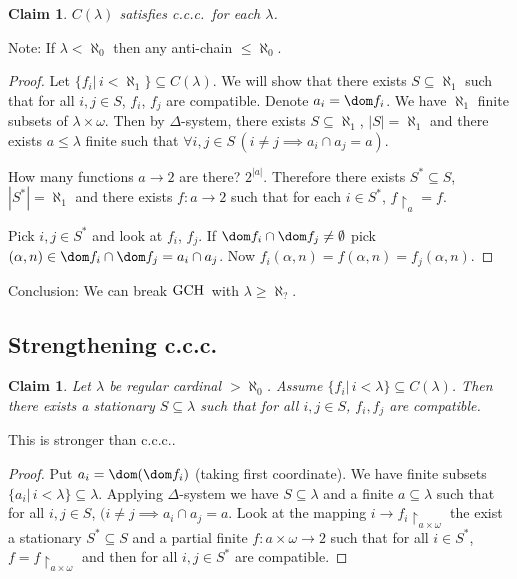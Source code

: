 \documentclass[11pt,pdftex,twoside,a4paper]{article}
\newcommand{\ccc}{c.c.c.}
\newcommand{\GCH}{\ensuremath{\mathop{\rm GCH}\nolimits}}
\newtheorem{claim}[thm]{Claim}
\theoremstyle{definition}
\begin{document}
\begin{claim}
\(C(\lambda)\) satisfies \ccc\ for each \(\lambda\).
\end{claim}
Note: If \(\lambda<\aleph_0\) then any anti-chain \(\leq\aleph_0\).
\begin{proof}
Let \(\{f_i|\, i <\aleph_1\} \subseteq C(\lambda)\).
We will show that there exists \(S\subseteq \aleph_1\) such that
for all \(i,j\in S\), \(f_i\), \(f_j\) are compatible.
Denote \(a_i = \dom f_i\). We have \(\aleph_1\) finite subsets of
\(\lambda\times\omega\).
Then by \(\Delta\)-system,
there exists \(S\subseteq \aleph_1\),
\(|S|=\aleph_1\) and there exists \(a\leq\lambda\) finite
such that \(\forall i,j\in S\, (i\neq j\implies a_i\cap a_j=a)\).

How many functions \(a\to 2\) are there? \(2^{|a|}\).
Therefore there exists \(S^*\subseteq S\), \(|S^*|=\aleph_1\)
and there exists \(f:a\to 2\) such that for each \(i\in S^*\),
\(f{\restriction}_a = f\).

Pick \(i,j\in S^*\) and look at \(f_i\), \(f_j\).
If \(\dom f_i \cap \dom f_j \neq\emptyset\)
 pick \((\alpha,n)\in \dom f_i \cap \dom f_j = a_i\cap a_j\).
Now \(f_i(\alpha,n) = f(\alpha,n) = f_j(\alpha,n)\).
\end{proof}
Conclusion: We can break \GCH\ with \(\lambda\geq\aleph_?\).

\subsection{Strengthening \ccc}

\begin{claim}
Let \(\lambda\) be regular cardinal \(>\aleph_0\).
Assume \(\{f_i|\, i < \lambda\} \subseteq C(\lambda)\).
Then there exists a stationary \(S\subseteq \lambda\)
such that for all \(i,j\in S\), \(f_i,f_j\) are compatible.
\end{claim}
This is stronger than \ccc.
\begin{proof}
Put \(a_i = \dom(\dom f_i)\) (taking first coordinate).
We have finite subsets \(\{a_i|\,i<\lambda\}\subseteq\lambda\).
Applying \(\Delta\)-system we have \(S\subseteq \lambda\)
and a finite \(a\subseteq\lambda\) such that for all \(i,j\in S\),
\((i\neq j\implies a_i\cap a_j = a\).
Look at the mapping \(i\to f_i{\restriction}_{a\times\omega}\)
the exist a stationary \(S^*\subseteq S\) and
a partial finite \(f:a\times\omega\to 2\) such that for all
\(i\in S^*\), \(f = f{\restriction}_{a\times\omega}\) and then for all
\(i,j\in S^*\) are compatible.
\end{proof}
\end{document}
